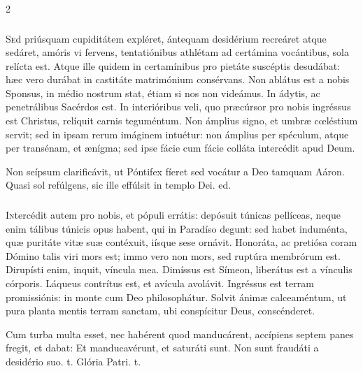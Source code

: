 \documentclass[9pt,twoside]{extarticle}
\begin{document}
\begin{multicols}{2}
\subsubsection*{\center {}}
\lettrine{S}ed priúsquam cupiditátem expléret, ántequam desidérium recreáret atque sedáret, amóris vi fervens, tentatiónibus athlétam ad certámina vocántibus, sola relícta est. Atque ille quidem in certamínibus pro pietáte suscéptis desudábat: hæc vero durábat in castitáte matrimónium consérvans. Non ablátus est a nobis Sponsus, in médio nostrum stat, étiam si nos non videámus. In ádytis, ac penetrálibus Sacérdos est. In interióribus veli, quo præcúrsor pro nobis ingréssus est Christus, relíquit carnis teguméntum. Non ámplius signo, et umbræ cœléstium servit; sed in ipsam rerum imáginem intuétur: non ámplius per spéculum, atque per transénam, et ænígma; sed ipse fácie cum fácie colláta intercédit apud Deum. 

\begin{tightlist}{}
\item {} Non seípsum clarificávit, ut Póntifex fíeret \textred{*} sed vocátur a Deo tamquam Aáron.  Quasi sol refúlgens, sic ille effúlsit in templo Dei. ed.
\end{tightlist}

\subsubsection*{\center {}}
\lettrine{I}ntercédit autem pro nobis, et pópuli errátis: depósuit túnicas pellíceas, neque enim tálibus túnicis opus habent, qui in Paradíso degunt: sed habet induménta, quæ puritáte vitæ suæ contéxuit, iísque sese ornávit. Honoráta, ac pretiósa coram Dómino talis viri mors est; immo vero non mors, sed ruptúra membrórum est. Dirupísti enim, inquit, víncula mea. Dimíssus est Símeon, liberátus est a vínculis córporis. Láqueus contrítus est, et avícula avolávit. Ingréssus est terram promissiónis: in monte cum Deo philosophátur. Solvit ánimæ calceaméntum, ut pura planta mentis terram sanctam, ubi conspícitur Deus, conscénderet.

\begin{tightlist}{}
\item {} Cum turba multa esset, nec habérent quod manducárent, accípiens septem panes fregit, et dabat: \textred{*} Et manducavérunt, et saturáti sunt.  Non sunt fraudáti a desidério suo. t. Glória Patri. t.
\end{tightlist}


\end{multicols}
\end{document}
